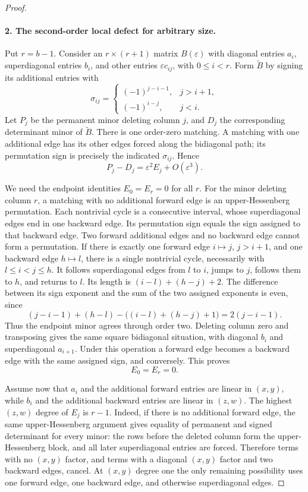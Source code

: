\documentclass[11pt,a4paper]{article}
\theoremstyle{definition}\newtheorem{definition}{Definition}
\begin{document}
\begin{proof}
\paragraph{2. The second-order local defect for arbitrary size.}
Put $r=b-1$. Consider an $r\times(r+1)$ matrix $B(\varepsilon)$
with diagonal entries $a_i$, superdiagonal entries $b_i$, and
other entries $\varepsilon c_{ij}$, with $0\leq i<r$.
Form $\widetilde B$ by signing its additional entries with
\[
 \sigma_{ij}=\begin{cases}
 (-1)^{j-i-1},&j>i+1,\\
 (-1)^{i-j},&j<i.
 \end{cases}
\]
Let $P_j$ be the permanent minor deleting column $j$, and $D_j$
the corresponding determinant minor of $\widetilde B$.
There is one order-zero matching. A matching with one additional
edge has its other edges forced along the bidiagonal path; its
permutation sign is precisely the indicated $\sigma_{ij}$.
Hence
\begin{equation}\label{R22:local_defect}
 P_j-D_j=\varepsilon^2E_j+O(\varepsilon^3).
\end{equation}

We need the endpoint identities $E_0=E_r=0$ for all $r$.
For the minor deleting column $r$, a matching with no additional
forward edge is an upper-Hessenberg permutation. Each nontrivial
cycle is a consecutive interval, whose superdiagonal edges end in
one backward edge. Its permutation sign equals the sign assigned
to that backward edge. Two forward additional edges and no backward
edge cannot form a permutation. If there is exactly one forward
edge $i\mapsto j$, $j>i+1$, and one backward edge $h\mapsto l$,
there is a single nontrivial cycle, necessarily with
$l\leq i<j\leq h$. It follows superdiagonal edges from $l$ to $i$,
jumps to $j$, follows them to $h$, and returns to $l$.
Its length is $(i-l)+(h-j)+2$. The difference between its sign
exponent and the sum of the two assigned exponents is even, since
\[
 (j-i-1)+(h-l)-\big((i-l)+(h-j)+1\big)=2(j-i-1).
\]
Thus the endpoint minor agrees through order two.
Deleting column zero and transposing gives the same square
bidiagonal situation, with diagonal $b_i$ and superdiagonal
$a_{i+1}$. Under this operation a forward edge becomes a backward
edge with the same assigned sign, and conversely. This proves
\begin{equation}\label{R22:endpoints}
 E_0=E_r=0.
\end{equation}

Assume now that $a_i$ and the additional forward entries are
linear in $(x,y)$, while $b_i$ and the additional backward entries
are linear in $(z,w)$. The highest $(z,w)$ degree of $E_j$ is
$r-1$. Indeed, if there is no additional forward edge, the same
upper-Hessenberg argument gives equality of permanent and signed
determinant for every minor: the rows before the deleted column
form the upper-Hessenberg block, and all later superdiagonal
entries are forced. Therefore terms with no $(x,y)$ factor, and
terms with a diagonal $(x,y)$ factor and two backward edges, cancel.
At $(x,y)$ degree one the only remaining possibility uses one
forward edge, one backward edge, and otherwise superdiagonal edges.


\end{proof}
\end{document}
